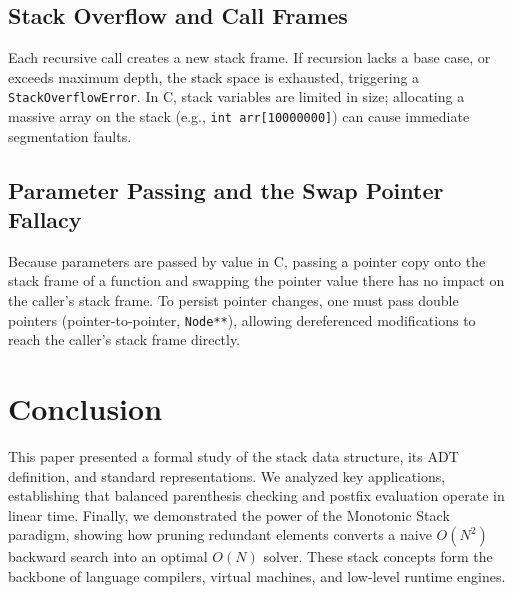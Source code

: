 \documentclass[10pt,journal,compsoc,onecolumn]{IEEEtran}
\begin{document}
\subsection{Stack Overflow and Call Frames}
Each recursive call creates a new stack frame. If recursion lacks a base case, or exceeds maximum depth, the stack space is exhausted, triggering a \texttt{StackOverflowError}. In C, stack variables are limited in size; allocating a massive array on the stack (e.g., \texttt{int arr[10000000]}) can cause immediate segmentation faults.

\subsection{Parameter Passing and the Swap Pointer Fallacy}
Because parameters are passed by value in C, passing a pointer copy onto the stack frame of a function and swapping the pointer value there has no impact on the caller's stack frame. To persist pointer changes, one must pass double pointers (pointer-to-pointer, \texttt{Node**}), allowing dereferenced modifications to reach the caller's stack frame directly.

\section{Conclusion}
This paper presented a formal study of the stack data structure, its ADT definition, and standard representations. We analyzed key applications, establishing that balanced parenthesis checking and postfix evaluation operate in linear time. Finally, we demonstrated the power of the Monotonic Stack paradigm, showing how pruning redundant elements converts a naive $O(N^2)$ backward search into an optimal $O(N)$ solver. These stack concepts form the backbone of language compilers, virtual machines, and low-level runtime engines.
\end{document}
